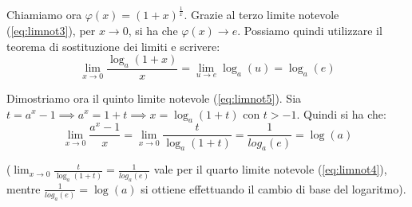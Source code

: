 \documentclass{article}
\begin{document}
\noindent Chiamiamo ora $\varphi(x) = (1 + x)^\frac{1}{x}$. Grazie al terzo limite notevole (\ref{eq:limnot3}), per $x \to 0$, si ha che $\varphi(x) \to e$. Possiamo quindi utilizzare il teorema di sostituzione dei limiti e scrivere:
\begin{equation*}
    \lim_{x \to 0} \frac{\log_a(1 + x)}{x} = \lim_{u \to e} \log_a(u) = \log_a(e)
\end{equation*}

\noindent Dimostriamo ora il quinto limite notevole (\ref{eq:limnot5}). Sia $t = a^x - 1 \implies a^x = 1 + t \implies x = \log_a(1 + t)$ con $t > -1$. Quindi si ha che:
\begin{equation*}
    \lim_{x \to 0} \frac{a^x - 1}{x} = \lim_{x \to 0} \frac{t}{\log_a(1 + t)} = \frac{1}{log_a(e)} = \log(a)
\end{equation*}

\noindent ($\lim_{x \to 0} \frac{t}{\log_a(1 + t)} = \frac{1}{log_a(e)}$ vale per il quarto limite notevole (\ref{eq:limnot4}), mentre $\frac{1}{log_a(e)} = \log(a)$ si ottiene effettuando il cambio di base del logaritmo).
    
\end{document}
